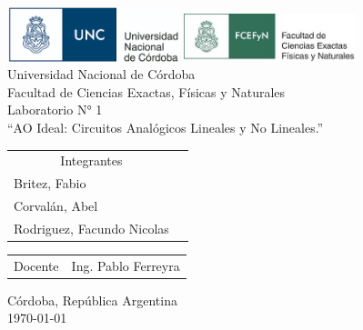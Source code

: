 \begin{titlepage}
    

\thispagestyle{empty}


\begin{center}
    \includegraphics[width=5cm]{img/unc_logo.png} \hspace{2cm}
    \includegraphics[width=5cm]{img/fcefyn_logo.jpg}
    \\[1cm]
    \vspace{5pt}
    \LARGE Universidad Nacional de Córdoba\\[0.6cm] 
    \large Facultad de Ciencias Exactas, Físicas y Naturales 
    \\[4cm] 
    \large Laboratorio N° 1
    \\[0.8cm]
    \large “AO Ideal: Circuitos Analógicos Lineales y No Lineales.”
    \\[0.2cm]
    \vspace{60pt}
    \begin{table}[!h]
    
    \centering
    \begin{tabular}{ll}
    \multicolumn{1}{c}{Integrantes} \\
    Britez, Fabio\\
    Corvalán, Abel \\
    Rodriguez, Facundo Nicolas 
    \end{tabular}
    \end{table}
    \vspace{20pt}
    \begin{table}[!h]
    \centering
    
    \begin{tabular}{ll}
    \multicolumn{1}{c}{Docente} & Ing. Pablo Ferreyra
    \end{tabular}
    \end{table}
    \vfill
    Córdoba, República Argentina\\
    \today
\end{center}

\end{titlepage}